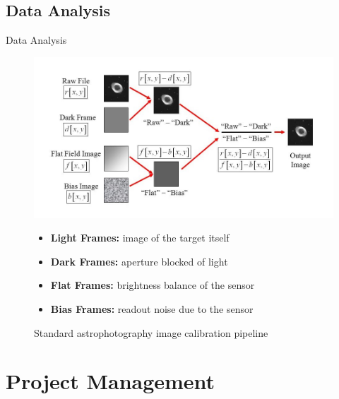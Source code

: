 \documentclass[11pt, aspectratio=169]{beamer}
\begin{document}
\subsection{Data Analysis}
\begin{frame}{Data Analysis}
\begin{figure}[!htb]
    \centering
    \hspace{-0.9cm}
    \begin{minipage}{0.65\textwidth}
        \centering
        \includegraphics[width=\linewidth]{figures/images/correctionpipeline.jpg}
        \caption{Standard astrophotography image calibration pipeline}
    \end{minipage}%
    \begin{minipage}{0.35\textwidth}
    \begin{itemize}%
        \item \textbf{Light Frames:} image of the target itself
        \item \textbf{Dark Frames:} aperture blocked of light
        \item \textbf{Flat Frames:} brightness balance of the sensor
        \item \textbf{Bias Frames:} readout noise due to the sensor
    \end{itemize}
    \end{minipage}
\end{figure}
\end{frame}


\section{Project Management}
\end{document}
